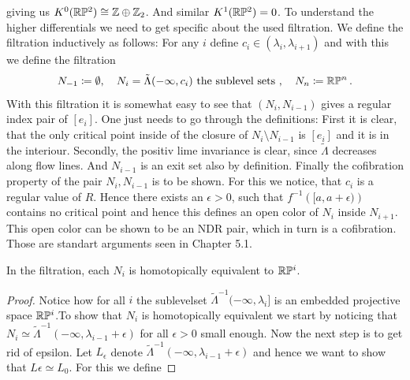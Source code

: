 \begin{example}
\begin{center}
\begin{tikzcd}
			\end{tikzcd}
		\end{center} giving us $K^0(\mathbb{R}\mathbb{P}^2)\cong \mathbb{Z}\oplus \mathbb{Z}_2$. 
		And similar $K^1(\mathbb{R}\mathbb{P}^2)=0$. 
		To understand the higher differentials we need to get specific about the used filtration. We define the filtration inductively as follows:
	For any $i$ define $c_i\in (\lambda_i,\lambda_{i+1})$ and with this we define the filtration 
	\begin{equation*}
		N_{-1}\coloneq \emptyset,\quad N_i=\tilde{\Lambda}(-\infty,c_i) \text{ the sublevel sets }, \quad N_n\coloneq \mathbb{R}\mathbb{P}^n\,.
	\end{equation*} With this filtration it is somewhat easy to see that $(N_i,N_{i-1})$ gives a regular index pair of $[e_i]$. One just needs to go through the definitions: First it is clear, that the only critical point inside of the closure of $N_i\setminus N_{i-1}$ is $[e_i]$ and it is in the interiour. Secondly, the positiv lime invariance is clear, since $\tilde{\Lambda}$ decreases along flow lines. And $N_{i-1}$ is an exit set also by definition. Finally the cofibration property of the pair $N_i,N_{i-1}$ is to be shown. For this we notice, that $c_i$ is a regular value of $R$. Hence there exists an $\epsilon>0$, such that $f^{-1}\left([a,a+\epsilon)\right)$ contains no critical point and hence this defines an open color of $N_i$ inside $N_{i+1}$. This open color can be shown to be an NDR pair, which in turn is a cofibration. Those are standart arguments seen in \cite{Whitehead1978} Chapter 5.1.
	\begin{lemma}
		In the filtration, each $N_i$ is homotopically equivalent to $\mathbb{R}\mathbb{P}^i$. 
	\end{lemma}
	\begin{proof}

Notice how for all $i$ the sublevelset $\tilde{\Lambda}^{-1}(-\infty,\lambda_i]$ is an embedded projective space $\mathbb{R}\mathbb{P}^i$.To show that $N_i$ is homotopically equivalent we start by noticing that $N_i\simeq \tilde{\Lambda}^{-1}(-\infty,\lambda_{i-1}+\epsilon)$ for all $\epsilon>0$ small enough. Now the next step is to get rid of epsilon. Let $L_\epsilon$ denote $\tilde{\Lambda}^{-1}(-\infty,\lambda_{i-1}+\epsilon)$ and hence we want to show that $L{\epsilon}\simeq L_0$. For this we define 

\end{proof}
\end{example}
